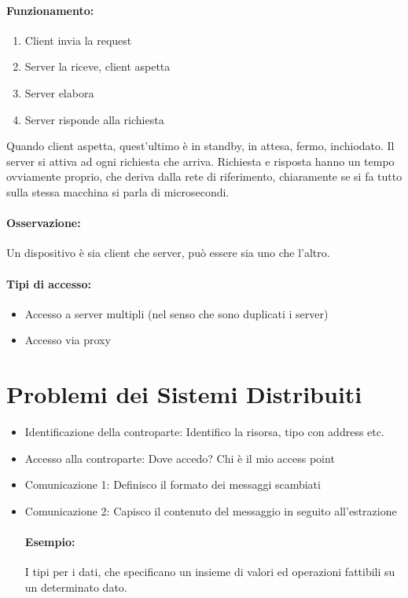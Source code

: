 \documentclass[12pt, a4paper, openany, twoside]{book}
\begin{document}
\paragraph{Funzionamento:}
\begin{enumerate}
	\item Client invia la request
	\item Server la riceve, client aspetta
	\item Server elabora
	\item Server risponde alla richiesta
\end{enumerate}
Quando client aspetta, quest'ultimo è in standby, in attesa, fermo, inchiodato.
Il server si attiva ad ogni richiesta che arriva. Richiesta e risposta hanno
un tempo ovviamente proprio, che deriva dalla rete di riferimento, chiaramente
se si fa tutto sulla stessa macchina si parla di microsecondi.
\paragraph{Osservazione:} Un dispositivo è sia client che server, può essere
sia uno che l'altro.
\paragraph{Tipi di accesso:}
\begin{itemize}
	\item Accesso a server multipli (nel senso che sono duplicati i server)
	\item Accesso via proxy
\end{itemize}
\section{Problemi dei Sistemi Distribuiti}
\begin{itemize}
	\item Identificazione della controparte: Identifico la risorsa, tipo con
	address etc.
	\item Accesso alla controparte: Dove accedo? Chi è il mio access point
	\item Comunicazione 1: Definisco il formato dei messaggi scambiati
	\item Comunicazione 2: Capisco il contenuto del messaggio in seguito 
	all'estrazione
	\paragraph{Esempio:} I tipi per i dati, che specificano un insieme 
	di valori ed operazioni fattibili su un determinato dato.
\end{itemize}
\end{document}
